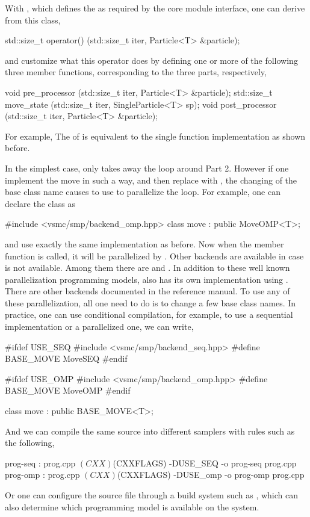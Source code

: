 With , which defines the  as
required by the core module interface, one can derive from this class,
\begin{cppcode}
std::size_t operator() (std::size_t iter, Particle<T> &particle);
\end{cppcode}
and customize what this operator does by defining one or more of the following
three member functions, corresponding to the three parts, respectively,
\begin{cppcode}
void pre_processor (std::size_t iter, Particle<T> &particle);
std::size_t move_state (std::size_t iter, SingleParticle<T> sp);
void post_processor (std::size_t iter, Particle<T> &particle);
\end{cppcode}
For example,
The  of  is equivalent to the
single function implementation as shown before.

In the simplest case,  only takes away the loop around Part
2. However if one implement the move in such a way, and then replace
 with , the changing of the base class
name causes \vsmc to use \openmp to parallelize the loop. For example, one can
declare the class as
\begin{cppcode}
#include <vsmc/smp/backend_omp.hpp>
class move : public MoveOMP<T>;
\end{cppcode}
and use exactly the same implementation as before. Now when the member
function  is called, it will be parallelized by
\openmp.  Other backends are available in case \openmp is not available. Among
them there are \cilk and \tbb. In addition to these well known parallelization
programming models, \vsmc also has its own implementation using \cppoo{}
. There are other backends documented in the reference
manual. To use any of these parallelization, all one need to do is to change a
few base class names. In practice, one can use conditional compilation, for
example, to use a sequential implementation or a \openmp parallelized one, we
can write,
\begin{cppcode}
#ifdef USE_SEQ
#include <vsmc/smp/backend_seq.hpp>
#define BASE_MOVE MoveSEQ
#endif

#ifdef USE_OMP
#include <vsmc/smp/backend_omp.hpp>
#define BASE_MOVE MoveOMP
#endif

class move : public BASE_MOVE<T>;
\end{cppcode}
And we can compile the same source into different samplers with
 rules such as the following,
\begin{makecode}
prog-seq : prog.cpp
        $(CXX) $(CXXFLAGS) -DUSE_SEQ -o prog-seq prog.cpp
prog-omp : prog.cpp
        $(CXX) $(CXXFLAGS) -DUSE_omp -o prog-omp prog.cpp
\end{makecode}
Or one can configure the source file through a build system such as \cmake,
which can also determine which programming model is available on the system.

